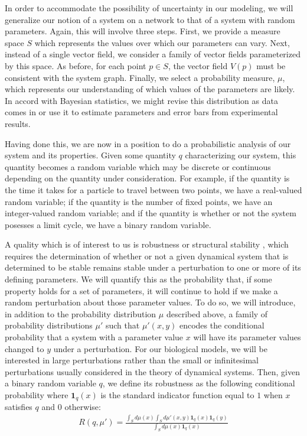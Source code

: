 In order to accommodate the possibility of uncertainty in our
modeling, we will generalize our notion of a system on a network to
that of a system with random parameters.  Again, this will involve
three steps. First, we provide a measure space $S$
which represents the values over which our parameters can vary. Next,
instead of a single vector field, we consider a family of vector
fields parameterized by this space.  As before, for
each point $p \in S$, the vector field $V(p)$ must be consistent with
the system graph. Finally, we select a probability measure, $\mu$, which represents our understanding of which values of the parameters
are likely. In accord with Bayesian statistics, we might revise this
distribution as data comes in or use it to estimate parameters and error
bars from experimental results.

Having done this, we are now in a position to do a probabilistic analysis
of our system and its properties.  Given some quantity $q$ characterizing
our system, this quantity becomes a random variable which may be discrete or
continuous depending on the quantity under consideration.  For example, if
the quantity is the time it takes for a particle to travel between two points,
we have a real-valued random variable; if the quantity is the number of fixed
points, we have an integer-valued random variable; and if the quantity is
whether or not the system posesses a limit cycle, we have a binary random
variable.

A quality which is of interest to us is robustness or structural stability \cite{Smale1967}, which requires the determination of whether or not a given dynamical system that is determined to be stable remains stable under a perturbation to one or more of its defining parameters.  We will quantify this as the probability that, if some property holds for a set of parameters, it will continue to hold if we make a random perturbation about those parameter values. To do so, we will introduce, in addition to the probability distribution $\mu$ described above, a family of probability distributions $\mu'$ such that $\mu'(x,y)$ encodes the conditional probability that a system with a parameter value $x$ will have its parameter values changed to $y$ under a perturbation.  For our biological models, we will be interested in large perturbations rather than the small or infinitesimal perturbations usually considered in the theory of dynamical systems.  Then, given a binary random variable $q$, we define its robustness as the following conditional probability where $\mathbf{1}_q(x)$ is the standard indicator function equal to $1$ when $x$ satisfies $q$ and $0$ otherwise:
\begin{align}\label{eq:robustness}
  R (q,\mu') =
  \frac{\int_S d\mu(x) \int_S d\mu'(x,y) \mathbf{1}_q(x) \mathbf{1}_q(y)}
  {\int_S d\mu(x) \mathbf{1}_q(x)}
\end{align}

